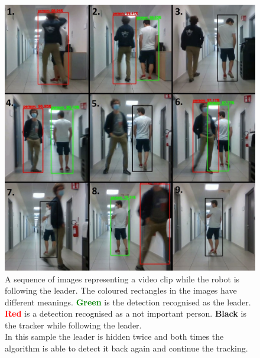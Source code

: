 \begin{figure}[!h]
	\centering
	\includegraphics[width=\linewidth]{images/solution/sequenceTrackOk}
	\captionsetup{margin=0.5cm}
	\caption[A video clip frames sequence of the tracking.]{A sequence of images representing a video clip while the robot is following the leader. The coloured rectangles in the images have different meanings. \textbf{\textcolor{green}{Green}} is the detection recognised as the leader. \textbf{\textcolor{red}{Red}} is a detection recognised as a not important person. \textbf{Black} is the tracker while following the leader.\\
		In this sample the leader is hidden twice and both times the algorithm is able to detect it back again and continue the tracking.}
	\label{fig:sequenceTracking}
\end{figure}


